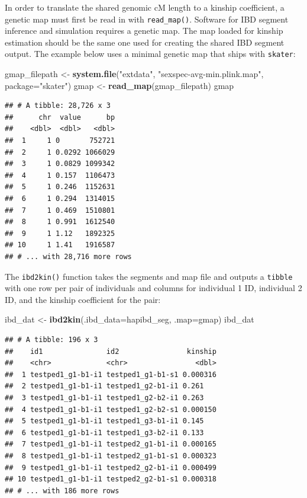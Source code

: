 \documentclass[9pt,a4paper,]{extarticle}
\newenvironment{Shaded}{\begin{snugshade}}{\end{snugshade}}
\newcommand{\DataTypeTok}[1]{\textcolor[rgb]{0.13,0.29,0.53}{#1}}
\newcommand{\KeywordTok}[1]{\textcolor[rgb]{0.13,0.29,0.53}{\textbf{#1}}}
\newcommand{\NormalTok}[1]{#1}
\newcommand{\StringTok}[1]{\textcolor[rgb]{0.31,0.60,0.02}{#1}}
\begin{document}
In order to translate the shared genomic cM length to a kinship coefficient, a genetic map must first be read in with \texttt{read\_map()}. Software for IBD segment inference and simulation requires a genetic map. The map loaded for kinship estimation should be the same one used for creating the shared IBD segment output. The example below uses a minimal genetic map that ships with \texttt{skater}:

\begin{Shaded}
\begin{Highlighting}[]
\NormalTok{gmap_filepath <-}\StringTok{ }\KeywordTok{system.file}\NormalTok{(}\StringTok{"extdata"}\NormalTok{, }\StringTok{"sexspec-avg-min.plink.map"}\NormalTok{, }
                             \DataTypeTok{package=}\StringTok{"skater"}\NormalTok{)}
\NormalTok{gmap <-}\StringTok{ }\KeywordTok{read_map}\NormalTok{(gmap_filepath)}
\NormalTok{gmap}
\end{Highlighting}
\end{Shaded}

\begin{verbatim}
## # A tibble: 28,726 x 3
##      chr  value      bp
##    <dbl>  <dbl>   <dbl>
##  1     1 0       752721
##  2     1 0.0292 1066029
##  3     1 0.0829 1099342
##  4     1 0.157  1106473
##  5     1 0.246  1152631
##  6     1 0.294  1314015
##  7     1 0.469  1510801
##  8     1 0.991  1612540
##  9     1 1.12   1892325
## 10     1 1.41   1916587
## # ... with 28,716 more rows
\end{verbatim}

The \texttt{ibd2kin()} function takes the segments and map file and outputs a \texttt{tibble} with one row per pair of individuals and columns for individual 1 ID, individual 2 ID, and the kinship coefficient for the pair:

\begin{Shaded}
\begin{Highlighting}[]
\NormalTok{ibd_dat <-}\StringTok{ }\KeywordTok{ibd2kin}\NormalTok{(}\DataTypeTok{.ibd_data=}\NormalTok{hapibd_seg, }\DataTypeTok{.map=}\NormalTok{gmap)}
\NormalTok{ibd_dat}
\end{Highlighting}
\end{Shaded}

\begin{verbatim}
## # A tibble: 196 x 3
##    id1               id2                kinship
##    <chr>             <chr>                <dbl>
##  1 testped1_g1-b1-i1 testped1_g1-b1-s1 0.000316
##  2 testped1_g1-b1-i1 testped1_g2-b1-i1 0.261   
##  3 testped1_g1-b1-i1 testped1_g2-b2-i1 0.263   
##  4 testped1_g1-b1-i1 testped1_g2-b2-s1 0.000150
##  5 testped1_g1-b1-i1 testped1_g3-b1-i1 0.145   
##  6 testped1_g1-b1-i1 testped1_g3-b2-i1 0.133   
##  7 testped1_g1-b1-i1 testped2_g1-b1-i1 0.000165
##  8 testped1_g1-b1-i1 testped2_g1-b1-s1 0.000323
##  9 testped1_g1-b1-i1 testped2_g2-b1-i1 0.000499
## 10 testped1_g1-b1-i1 testped2_g2-b1-s1 0.000318
## # ... with 186 more rows
\end{verbatim}
\end{document}
